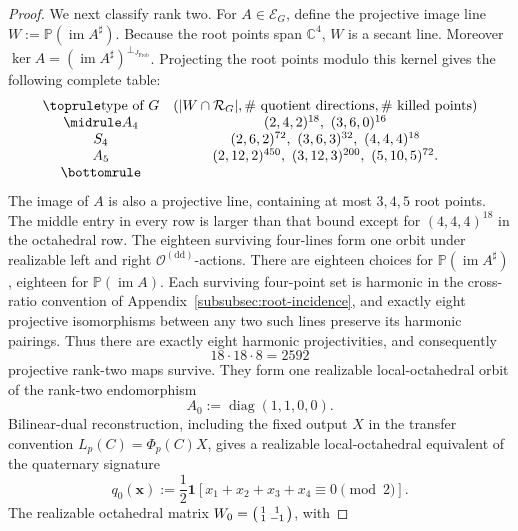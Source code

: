 \documentclass[11pt,letterpaper,onecolumn]{article}
\theoremstyle{plain}
\theoremstyle{definition}
\theoremstyle{remark}
\newcommand{\OctDD}{{\mathcal O^{(\mathrm{dd})}}}
\newcommand{\diag}{\operatorname{diag}}
\newcommand{\one}{\mathbf 1}
\begin{document}
\begin{proof}
We next classify rank two.  For \(A\in\mathscr E_G\), define the projective
image line \(W:=\mathbb P(\operatorname{im}A^\sharp)\).  Because the root points span
\(\mathbb C^4\), \(W\) is a secant line.  Moreover
\(\ker A=(\operatorname{im}A^\sharp)^{\perp_{J_{\mathrm{Frob}}}}\).  Projecting the root points modulo this kernel
gives the following complete table:
\begin{equation*}
\begin{array}{cc}
\toprule
\text{type of }G&( |W\cap\mathcal R_G|,
   \#\text{ quotient directions},\#\text{ killed points})\\ \midrule
A_4&(2,4,2)^{18},\ (3,6,0)^{16}\\
S_4&(2,6,2)^{72},\ (3,6,3)^{32},\ (4,4,4)^{18}\\
A_5&(2,12,2)^{450},\ (3,12,3)^{200},\ (5,10,5)^{72}.\\
\bottomrule
\end{array}
\end{equation*}
The image of \(A\) is also a projective line, containing at most
\(3,4,5\) root points.  The middle entry in every row is larger than that
bound except for \((4,4,4)^{18}\) in the octahedral row.  The eighteen
surviving four-lines form one orbit under realizable left and right
\(\OctDD\)-actions.  There are eighteen choices for
\(\mathbb P(\operatorname{im}A^\sharp)\), eighteen for
\(\mathbb P(\operatorname{im}A)\).  Each surviving four-point set is
harmonic in the cross-ratio convention of
Appendix~\ref{subsubsec:root-incidence}, and exactly eight
projective isomorphisms between any two such lines preserve its harmonic
pairings.  Thus there are exactly eight harmonic projectivities, and
consequently
\begin{equation*}
  18\cdot18\cdot8=2592
\end{equation*}
projective rank-two maps survive.  They form one realizable local-octahedral
orbit of the rank-two endomorphism
\begin{equation*}
  A_0:=\diag(1,1,0,0).
\end{equation*}
Bilinear-dual reconstruction, including the fixed output \(X\) in the
transfer convention \(L_p(C)=\Phi_p(C)X\), gives a realizable local-octahedral
equivalent of the quaternary signature
\begin{equation*}
 q_0({\mathbf{x}}):=\frac12\one[x_1+x_2+x_3+x_4\equiv0\pmod2].
\end{equation*}
The realizable octahedral matrix
\(W_0=\begin{psmallmatrix}1&1\\1&-1\end{psmallmatrix}\), with

\end{proof}
\end{document}

